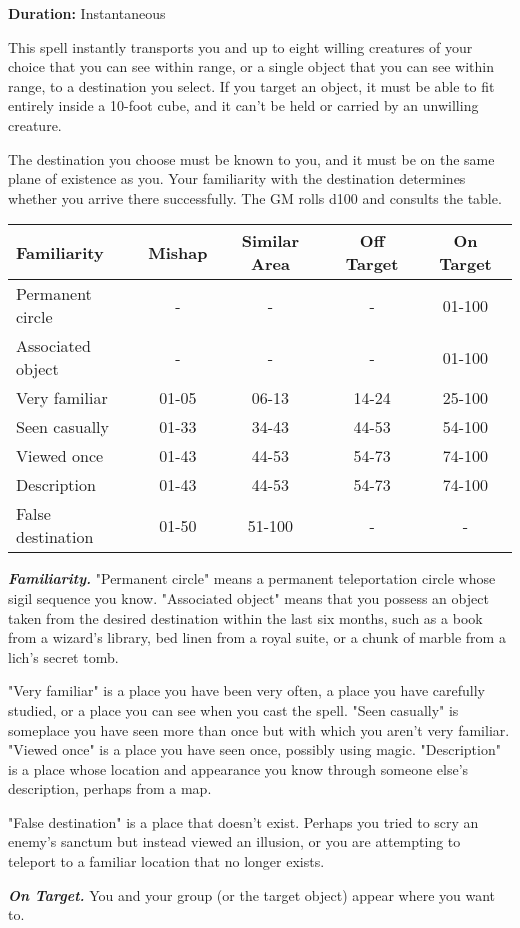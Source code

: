 \documentclass[
]{article}
\begin{document}
\textbf{Duration:} Instantaneous

This spell instantly transports you and up to eight willing creatures of
your choice that you can see within range, or a single object that you
can see within range, to a destination you select. If you target an
object, it must be able to fit entirely inside a 10-foot cube, and it
can't be held or carried by an unwilling creature.

The destination you choose must be known to you, and it must be on the
same plane of existence as you. Your familiarity with the destination
determines whether you arrive there successfully. The GM rolls d100 and
consults the table.

\begin{longtable}[]{@{}lcccc@{}}
\toprule
Familiarity & Mishap & Similar Area & Off Target & On
Target\tabularnewline
\midrule
\endhead
Permanent circle & - & - & - & 01-100\tabularnewline
Associated object & - & - & - & 01-100\tabularnewline
Very familiar & 01-05 & 06-13 & 14-24 & 25-100\tabularnewline
Seen casually & 01-33 & 34-43 & 44-53 & 54-100\tabularnewline
Viewed once & 01-43 & 44-53 & 54-73 & 74-100\tabularnewline
Description & 01-43 & 44-53 & 54-73 & 74-100\tabularnewline
False destination & 01-50 & 51-100 & - & -\tabularnewline
\bottomrule
\end{longtable}

\emph{\textbf{Familiarity.}} "Permanent circle" means a permanent
teleportation circle whose sigil sequence you know. "Associated object"
means that you possess an object taken from the desired destination
within the last six months, such as a book from a wizard's library, bed
linen from a royal suite, or a chunk of marble from a lich's secret
tomb.

"Very familiar" is a place you have been very often, a place you have
carefully studied, or a place you can see when you cast the spell. "Seen
casually" is someplace you have seen more than once but with which you
aren't very familiar. "Viewed once" is a place you have seen once,
possibly using magic. "Description" is a place whose location and
appearance you know through someone else's description, perhaps from a
map.

"False destination" is a place that doesn't exist. Perhaps you tried to
scry an enemy's sanctum but instead viewed an illusion, or you are
attempting to teleport to a familiar location that no longer exists.

\emph{\textbf{On Target.}} You and your group (or the target object)
appear where you want to.
\end{document}
